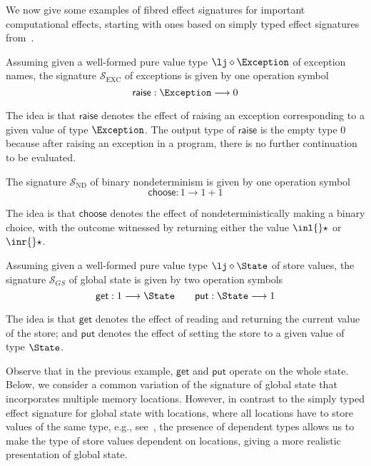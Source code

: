We now give some examples of fibred effect signatures for important computational effects, 
starting with ones based on simply typed effect signatures from~\cite{Plotkin:HandlingEffects}.

\begin{example}[Exceptions]
\label{ex:fibsigofexceptions}
Assuming given a well-formed pure value type $\lj \diamond \Exception$ of exception names, the signature $\mathcal{S}_{\text{EXC}}$ of exceptions is given by one operation symbol
\[
\mathsf{raise} : \Exception \longrightarrow 0
\]

The idea is that $\mathsf{raise}$ denotes the effect of raising an exception corresponding to a given value of type $\Exception$. The output type of $\mathsf{raise}$ is the empty type $0$ because after raising an exception in a program, there is no further continuation to be evaluated.
\end{example}

\begin{example}
\label{ex:fibsigofnondeterminism}
The signature $\mathcal{S}_{\text{ND}}$ of binary nondeterminism is given by one operation symbol
\[
\mathsf{choose} : 1 \longrightarrow 1 + 1
\]

The idea is that $\mathsf{choose}$ denotes the effect of nondeterministically making a binary
choice, with the outcome witnessed by returning either the value $\inl {} \star$ or $\inr {} \star$. \end{example}

\begin{example}
\label{ex:fibsigofstate}
Assuming given a well-formed pure value type $\lj \diamond \State$ of store values, the signature $\mathcal{S}_{GS}$ of global state is given by two operation symbols
\[
\mathsf{get} : 1 \longrightarrow \State 
\qquad
\mathsf{put} : \State \longrightarrow 1 
\]

The idea is that $\mathsf{get}$ denotes the effect of reading and returning the current value of the store; and $\mathsf{put}$ denotes the effect of setting the store to a given value of type $\State$. 
\end{example}

Observe that in the previous example, $\mathsf{get}$ and $\mathsf{put}$ operate on the whole state. Below, we consider a common variation of the signature of global state that incorporates multiple memory locations. However, in contrast to the simply typed effect signature for global state with locations, where all locations have to store values of the same type, e.g., see~\cite{Plotkin:HandlingEffects},
the presence of dependent types allows us to make the type of store values dependent on locations, giving a more realistic presentation of global state. 

